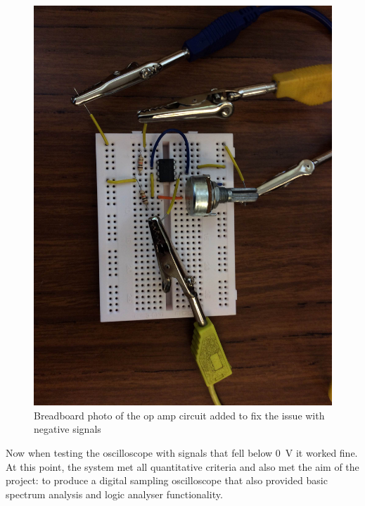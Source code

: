 \begin{figure}[h]
  \includegraphics[width=\linewidth]{img/introCircuitPhoto.jpg}
  \caption{Breadboard photo of the op amp circuit added to fix the issue with negative signals}
  \label{fig:introCircuitPhoto}
\end{figure}

Now when testing the oscilloscope with signals that fell below \SI{0}{\V} it
worked fine. At this point, the system met all quantitative criteria and also
met the aim of the project: to produce a digital sampling oscilloscope that also
provided basic spectrum analysis and logic analyser functionality.
